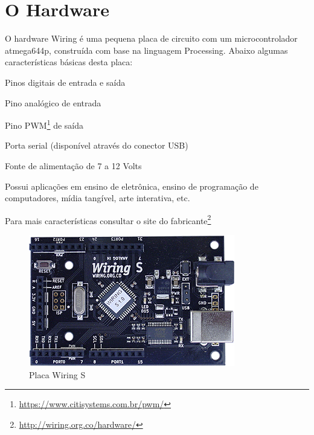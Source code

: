 \section[O Hardware]{O Hardware}

O hardware Wiring é uma pequena placa de circuito com um microcontrolador atmega644p, construída com base na linguagem Processing. Abaixo algumas características básicas desta placa: 

\begin{alineas}
    \item Pinos digitais de entrada e saída
    \item Pino analógico de entrada
    \item Pino PWM\footnote{\url{https://www.citisystems.com.br/pwm/}} de saída
    \item Porta serial (disponível através do conector USB)
    \item Fonte de alimentação de 7 a 12 Volts
\end{alineas}

Possui aplicações em ensino de eletrônica, ensino de programação de computadores, mídia tangível, arte interativa, etc.


Para mais características consultar o site do fabricante\footnote{\url{http://wiring.org.co/hardware/}}

\begin{figure}[htb]
	\caption{\label{wiringS}Placa Wiring S}
	\begin{center}
	    \includegraphics[scale=0.9]{artigo/refs/Rogue_BB_WRS}
	\end{center}
\end{figure}